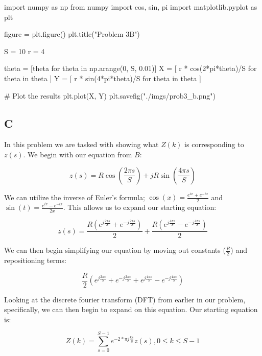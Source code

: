 \documentclass{article}
\begin{document}
\begin{python}
import numpy as np
from numpy import cos, sin, pi
import matplotlib.pyplot as plt

figure = plt.figure()
plt.title("Problem 3B")

S = 10
r = 4

theta = [theta for theta in np.arange(0, S, 0.01)]
X = [
        r * cos(2*pi*theta)/S
        for theta in theta
    ]
Y = [
        r * sin(4*pi*theta)/S
        for theta in theta
    ]

# Plot the results
plt.plot(X, Y)
plt.savefig("./imgs/prob3_b.png")
\end{python}

\subsection*{C}

In this problem we are tasked with showing what $Z(k)$ is corresponding to $z(s)$. We begin with our equation from $B$:

\begin{equation}
    z(s) = R \cos(\frac{2\pi s}{S}) + jR \sin(\frac{4\pi s}{S})
\end{equation}

\noindent We can utilize the inverse of Euler's formula; $\cos(x)=\frac{e^{ix}+e^{-ix}}{2}$ and $\sin(t) = \frac{e^{ix}-e^{-ix}}{2x}$. This allows us to expand our starting equation:

\begin{equation}
    z(s) = \frac{R(e^{j \frac{2 \pi s}{S}}+e^{-j \frac{2 \pi s}{S}})}{2} + \frac{R (e^{j \frac{4 \pi s}{S}} - e^{-j \frac{4 \pi s}{S}})}{2}
\end{equation}

\noindent We can then begin simplifying our equation by moving out constants ($\frac{R}{2}$) and repositioning terms:

\begin{equation}
    \frac{R}{2} (e^{j \frac{2 \pi s}{S}}+e^{-j \frac{2 \pi s}{S}} + e^{j \frac{4 \pi s}{S}} - e^{-j \frac{4 \pi s}{S}})
\end{equation}

Looking at the discrete fourier transform (DFT) from earlier in our problem, specifically, we can then begin to expand on this equation. Our starting equation is:

\begin{equation}
    Z(k) = \sum^{S-1}_{s=0} e^{-2*\pi j \frac{ks}{S}} z(s), 0\leq k \leq S-1
\end{equation}
\end{document}
